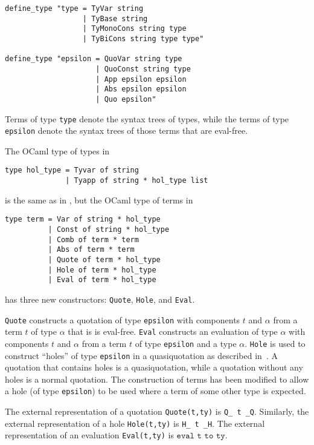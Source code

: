 \documentclass[fleqn]{llncs}
\begin{document}
\begin{lstlisting}
define_type "type = TyVar string
                  | TyBase string
                  | TyMonoCons string type
                  | TyBiCons string type type"

define_type "epsilon = QuoVar string type 
                     | QuoConst string type
                     | App epsilon epsilon
                     | Abs epsilon epsilon
                     | Quo epsilon"
\end{lstlisting}

\noindent
Terms of type \texttt{type} denote the syntax trees of {\HLQE} types,
while the terms of type \texttt{epsilon} denote the syntax trees of
those terms that are eval-free.

The OCaml type of {\HOL} types in {\HLQE}

\begin{lstlisting}
type hol_type = Tyvar of string
              | Tyapp of string * hol_type list
\end{lstlisting}

\noindent
is the same as in {\HL}, but the OCaml type of {\HOL} terms in {\HLQE}

\begin{lstlisting}
type term = Var of string * hol_type
          | Const of string * hol_type
          | Comb of term * term
          | Abs of term * term
          | Quote of term * hol_type
          | Hole of term * hol_type
          | Eval of term * hol_type
\end{lstlisting}

\noindent
has three new constructors: \texttt{Quote}, \texttt{Hole}, and
\texttt{Eval}.

\texttt{Quote} constructs a quotation of type \texttt{epsilon} with
components $t$ and $\alpha$ from a term $t$ of type $\alpha$ that is
is eval-free.  \texttt{Eval} constructs an evaluation of type $\alpha$
with components $t$ and $\alpha$ from a term $t$ of type
\texttt{epsilon} and a type $\alpha$.  \texttt{Hole} is used to
construct ``holes'' of type \texttt{epsilon} in a quasiquotation as
described in~\cite{Farmer18}.  A quotation that contains
holes is a quasiquotation, while a quotation without any holes is a
normal quotation.  The construction of terms has been
modified to allow a hole (of type \texttt{epsilon}) to be used where a
term of some other type is expected.

The external representation of a quotation \texttt{Quote(t,ty)} is
\texttt{Q\_ t \_Q}.  Similarly, the external representation of a hole
\texttt{Hole(t,ty)} is \texttt{H\_ t \_H}.  The external
representation of an evaluation \texttt{Eval(t,ty)} is $\texttt{eval
  t to ty}.$
\end{document}
